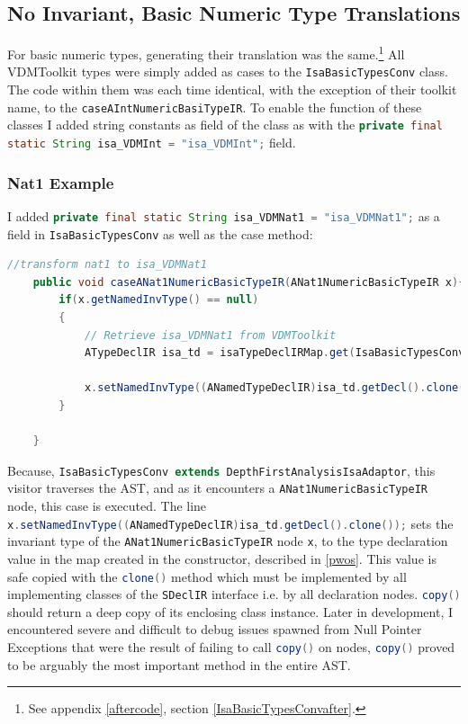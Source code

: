 	\subsection{No Invariant, Basic Numeric Type Translations}
	For basic numeric types, generating their translation was the same.\footnote{See appendix \ref{aftercode}, section \ref{IsaBasicTypesConvafter}.} All VDMToolkit types were simply added as cases to the \lstinline[language=Java]{IsaBasicTypesConv} class. The code within them was each time identical, with the exception of their toolkit name, to the \lstinline[language=Java]{caseAIntNumericBasiTypeIR}. To enable the function of these classes I added string constants as field of the class as with the \lstinline[language=Java]{private final static String isa_VDMInt = "isa_VDMInt";} field. 
	\subsubsection{Nat1 Example}
	I added \lstinline[language=Java]{private final static String isa_VDMNat1 = "isa_VDMNat1";} as a field in \lstinline[language=Java]{IsaBasicTypesConv} as well as the case method:
	\begin{lstlisting}[language=Java]
	//transform nat1 to isa_VDMNat1
    public void caseANat1NumericBasicTypeIR(ANat1NumericBasicTypeIR x){
        if(x.getNamedInvType() == null)
        {
            // Retrieve isa_VDMNat1 from VDMToolkit
            ATypeDeclIR isa_td = isaTypeDeclIRMap.get(IsaBasicTypesConv.isa_VDMNat1);

            x.setNamedInvType((ANamedTypeDeclIR)isa_td.getDecl().clone());
        }

    }
    \end{lstlisting}


    Because, \lstinline[language=Java]{IsaBasicTypesConv extends DepthFirstAnalysisIsaAdaptor}, this visitor traverses the AST, and as it encounters a \lstinline[language=Java]{ANat1NumericBasicTypeIR} node, this case is executed. The line \lstinline[language=Java]{x.setNamedInvType((ANamedTypeDeclIR)isa_td.getDecl().clone());} sets the invariant type of the \lstinline[language=Java]{ANat1NumericBasicTypeIR} node \lstinline[language=Java]{x}, to the type declaration value in the map created in the constructor, described in \ref{pwos}. This value is safe copied with the \lstinline[language=Java]{clone()} method which must be implemented by all implementing classes of the \lstinline[language=Java]{SDeclIR} interface i.e. by all declaration nodes. \lstinline[language=Java]{copy()} should return a deep copy of its enclosing class instance. Later in development, I encountered severe and difficult to debug issues spawned from Null Pointer Exceptions that were the result of failing to call \lstinline[language=Java]{copy()} on nodes, \lstinline[language=Java]{copy()} proved to be arguably the most important method in the entire AST. 

